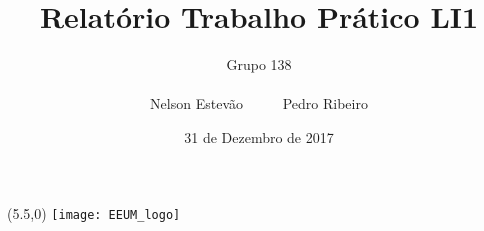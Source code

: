 \documentclass[a4paper]{report}
\title{Relatório Trabalho Prático LI1}
\author{Grupo 138 \\ \\
Nelson Estevão \ \ \ \ \ Pedro Ribeiro}
\date{31 de Dezembro de 2017}
\begin{document}
\begin{textblock}{5}(5.5,0)
  \centering
  \texttt{[image: EEUM\_logo]}
\end{textblock}

\maketitle

\tableofcontents

\listoffigures














\end{document}
